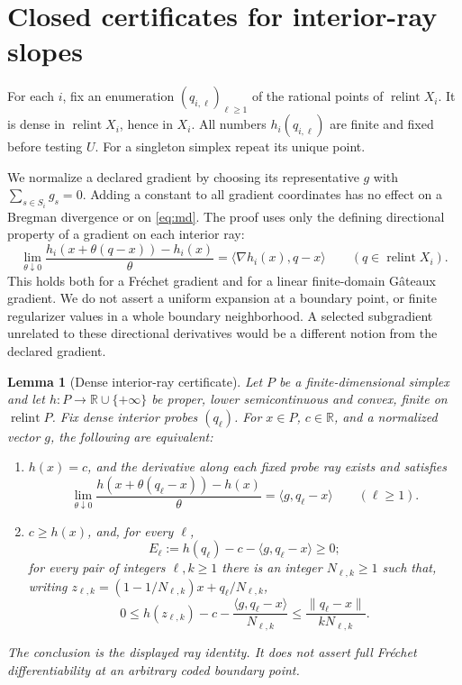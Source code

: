 \documentclass[11pt,a4paper]{article}
\newtheorem{lemma}[theorem]{Lemma}
\newcommand{\R}{\mathbb R}
\newcommand{\ri}{\operatorname{relint}}
\begin{document}
\section{Closed certificates for interior-ray slopes}

For each \(i\), fix an enumeration \((q_{i,\ell})_{\ell\ge1}\) of the
rational points of \(\ri X_i\). It is dense in \(\ri X_i\), hence in \(X_i\).
All numbers \(h_i(q_{i,\ell})\) are finite and fixed before testing \(U\).
For a singleton simplex repeat its unique point.

We normalize a declared gradient by choosing its representative \(g\) with
\(\sum_{s\in S_i}g_s=0\). Adding a constant to all gradient coordinates
has no effect on a Bregman divergence or on \eqref{eq:md}.
The proof uses only the defining directional property of a gradient on each
interior ray:
\begin{equation}
\lim_{\theta\downarrow0}
\frac{h_i(x+\theta(q-x))-h_i(x)}{\theta}
=\langle\nabla h_i(x),q-x\rangle\qquad(q\in\ri X_i).
\label{eq:dp}
\end{equation}
This holds both for a Fr\'echet gradient and for a linear finite-domain
G\^ateaux gradient. We do not assert a uniform expansion at a boundary point,
or finite regularizer values in a whole boundary neighborhood. A selected
subgradient unrelated to these directional derivatives would be a different
notion from the declared gradient.

\begin{lemma}[Dense interior-ray certificate]\label{rays}
Let \(P\) be a finite-dimensional simplex and let
\(h:P\to\R\cup\{+\infty\}\) be proper, lower semicontinuous and convex,
finite on \(\ri P\). Fix dense interior probes \((q_\ell)\).
For \(x\in P\), \(c\in\R\), and a normalized vector \(g\),
the following are equivalent:
\begin{enumerate}
\item \(h(x)=c\), and the derivative along each fixed probe ray exists and satisfies
\begin{equation}
\lim_{\theta\downarrow0}\frac{h(x+\theta(q_\ell-x))-h(x)}{\theta}
=\langle g,q_\ell-x\rangle\qquad(\ell\ge1).
\label{eq:d}
\end{equation}
\item \(c\ge h(x)\), and, for every \(\ell\),
\begin{equation}
E_\ell:=h(q_\ell)-c-\langle g,q_\ell-x\rangle\ge0;
\label{eq:g1}
\end{equation}
for every pair of integers \(\ell,k\ge1\) there is an integer
\(N_{\ell,k}\ge1\) such that, writing
\(z_{\ell,k}=(1-1/N_{\ell,k})x+q_\ell/N_{\ell,k}\),
\begin{equation}
0\le h(z_{\ell,k})-c-
\frac{\langle g,q_\ell-x\rangle}{N_{\ell,k}}
\le\frac{\|q_\ell-x\|}{kN_{\ell,k}}.
\label{eq:g2}
\end{equation}
\end{enumerate}
The conclusion is the displayed ray identity. It does not assert full
Fr\'echet differentiability at an arbitrary coded boundary point.
\end{lemma}
\end{document}
